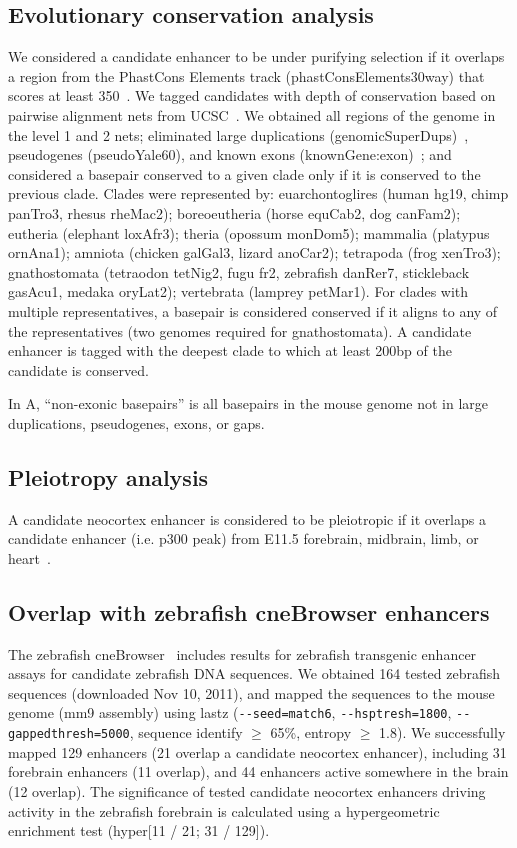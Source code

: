 \subsection{Evolutionary conservation analysis}
We considered a candidate enhancer to be under purifying selection if it overlaps a region from the PhastCons Elements
track (phastConsElements30way) that scores at least 350~\citep{Siepel2005}.  We tagged candidates with depth of conservation based on
pairwise alignment nets from UCSC~\citep{Kent2003}.  We obtained all regions of the genome in the level 1 and 2 nets; eliminated large
duplications (genomicSuperDups)~\citep{Bailey2002}, pseudogenes (pseudoYale60), and known exons (knownGene:exon)~\citep{Hsu2006}; and considered
a basepair conserved to a given clade only if it is conserved to the previous clade.  Clades were represented by: euarchontoglires (human hg19,
chimp panTro3, rhesus rheMac2); boreoeutheria (horse equCab2, dog canFam2); eutheria (elephant loxAfr3); theria (opossum monDom5); mammalia
(platypus ornAna1); amniota (chicken galGal3, lizard anoCar2); tetrapoda (frog xenTro3); gnathostomata (tetraodon tetNig2, fugu fr2, zebrafish
danRer7, stickleback gasAcu1, medaka oryLat2); vertebrata (lamprey petMar1).  For clades with multiple representatives, a basepair is considered
conserved if it aligns to any of the representatives (two genomes required for gnathostomata).  A candidate enhancer is tagged with the deepest
clade to which at least 200bp of the candidate is conserved.

In A, ``non-exonic basepairs'' is all basepairs in the mouse genome not in large duplications, pseudogenes, exons, or gaps.

\subsection{Pleiotropy analysis}
A candidate neocortex enhancer is considered to be pleiotropic if it overlaps a candidate enhancer (i.e. p300 peak) from E11.5 forebrain,
midbrain, limb, or heart~\citep{Blow2010}.

\subsection{Overlap with zebrafish cneBrowser enhancers}
The zebrafish cneBrowser~\citep{Li2010, Persampieri2008} includes results for zebrafish transgenic enhancer assays for candidate zebrafish
DNA sequences.  We obtained 164 tested zebrafish sequences (downloaded Nov 10, 2011), and mapped the sequences to the mouse genome (mm9 assembly)
using lastz (\texttt{-{}-seed=match6}, \texttt{-{}-hsptresh=1800}, \texttt{-{}-gappedthresh=5000}, sequence identify $\ge$ 65\%, entropy $\ge$ 1.8).  We successfully mapped 129
enhancers (21 overlap a candidate neocortex enhancer), including 31 forebrain enhancers (11 overlap), and 44 enhancers active somewhere in the
brain (12 overlap).  The significance of tested candidate neocortex enhancers driving activity in the zebrafish forebrain is calculated
using a hypergeometric enrichment test (hyper[11 / 21; 31 / 129]).

